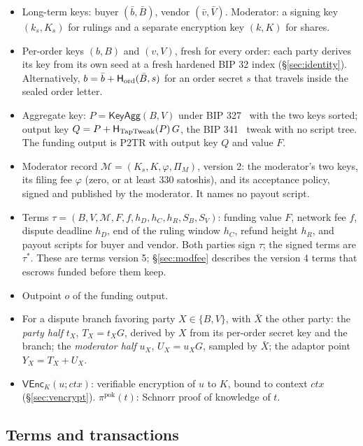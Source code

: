 \begin{itemize}
  \item Long-term keys: buyer $(\bar b,\bar B)$, vendor $(\bar v,\bar V)$. Moderator: a signing key $(k_s,K_s)$ for rulings and a separate encryption key $(k,K)$ for shares.
  \item Per-order keys $(b,B)$ and $(v,V)$, fresh for every order: each party derives its key from its own seed at a fresh hardened BIP 32 index (\S\ref{sec:identity}). Alternatively, $b=\bar b+\mathsf{H}_{\mathrm{ord}}(\bar B,s)$ for an order secret $s$ that travels inside the sealed order letter.
  \item Aggregate key: $P=\mathsf{KeyAgg}(B,V)$ under BIP 327~\citep{bip327} with the two keys sorted; output key $Q=P+\mathsf{H}_{\mathrm{TapTweak}}(P)\,G$, the BIP 341~\citep{bip341} tweak with no script tree. The funding output is P2TR with output key $Q$ and value $F$.
  \item Moderator record $\mathcal{M}=(K_s,K,\varphi,\Pi_M)$, version 2: the moderator's two keys, its filing fee $\varphi$ (zero, or at least 330 satoshis), and its acceptance policy, signed and published by the moderator. It names no payout script.
  \item Terms $\tau=(B,V,\mathcal{M},F,f,h_D,h_C,h_R,S_B,S_V)$: funding value $F$, network fee $f$, dispute deadline $h_D$, end of the ruling window $h_C$, refund height $h_R$, and payout scripts for buyer and vendor. Both parties sign $\tau$; the signed terms are $\tau^\ast$. These are terms version 5; \S\ref{sec:modfee} describes the version 4 terms that escrows funded before them keep.
  \item Outpoint $o$ of the funding output.
  \item For a dispute branch favoring party $X\in\{B,V\}$, with $\bar X$ the other party: the \emph{party half} $t_X$, $T_X=t_XG$, derived by $X$ from its per-order secret key and the branch; the \emph{moderator half} $u_X$, $U_X=u_XG$, sampled by $\bar X$; the adaptor point $Y_X=T_X+U_X$.
  \item $\mathsf{VEnc}_K(u;\mathit{ctx})$: verifiable encryption of $u$ to $K$, bound to context $\mathit{ctx}$ (\S\ref{sec:vencrypt}). $\pi^{\mathrm{pok}}(t)$: Schnorr proof of knowledge of $t$.
\end{itemize}



\subsection{Terms and transactions}

